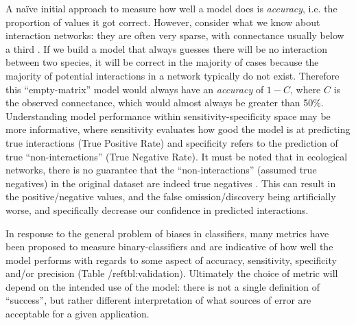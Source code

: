 A naïve initial approach to measure how well a model does is
\emph{accuracy}, i.e. the proportion of values it got correct. However,
consider what we know about interaction networks: they are often very
sparse, with connectance usually below a third \cite{Cohen1990ComFoo}.
If we build a model that always guesses there will be no interaction
between two species, it will be correct in the majority of cases because
the majority of potential interactions in a network typically do not
exist. Therefore this ``empty-matrix'' model would always have an
\emph{accuracy} of \(1-C\), where \(C\) is the observed connectance,
which would almost always be greater than 50\%. Understanding model
performance within sensitivity-specificity space may be more
informative, where sensitivity evaluates how good the model is at
predicting true interactions (True Positive Rate) and specificity refers
to the prediction of true ``non-interactions'' (True Negative Rate). It
must be noted that in ecological networks, there is no guarantee that
the ``non-interactions'' (assumed true negatives) in the original
dataset are indeed true negatives \cite{Jordano2016ChaEco,
Jordano2016SamNet}. This can result in the positive/negative values,
and the false omission/discovery being artificially worse, and
specifically decrease our confidence in predicted interactions.

In response to the general problem of biases in classifiers, many
metrics have been proposed to measure binary-classifiers
\cite{Gu2009EvaMea, Drummond2006CosCur} and are indicative of how well
the model performs with regards to some aspect of accuracy, sensitivity,
specificity and/or precision (Table /ref{tbl:validation}). Ultimately the choice of
metric will depend on the intended use of the model: there is not a
single definition of ``success'', but rather different interpretation of
what sources of error are acceptable for a given application.


